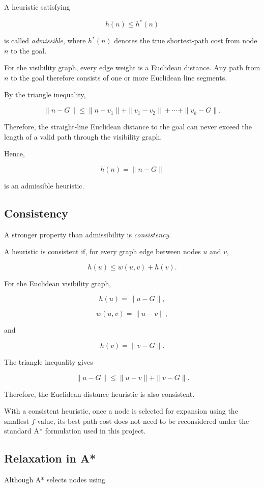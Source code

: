 A heuristic satisfying

\[
h(n)\leq h^*(n)
\]

is called \emph{admissible}, where $h^*(n)$ denotes the true shortest-path
cost from node $n$ to the goal.

For the visibility graph, every edge weight is a Euclidean distance.
Any path from $n$ to the goal therefore consists of one or more Euclidean
line segments.

By the triangle inequality,

\[
\|n-G\|
\leq
\|n-v_1\|
+
\|v_1-v_2\|
+
\cdots
+
\|v_k-G\|.
\]

Therefore, the straight-line Euclidean distance to the goal can never
exceed the length of a valid path through the visibility graph.

Hence,

\[
h(n)=\|n-G\|
\]

is an admissible heuristic.

\subsection{Consistency}

A stronger property than admissibility is \emph{consistency}.

A heuristic is consistent if, for every graph edge between nodes $u$ and
$v$,

\[
h(u)
\leq
w(u,v)+h(v).
\]

For the Euclidean visibility graph,

\[
h(u)=\|u-G\|,
\]

\[
w(u,v)=\|u-v\|,
\]

and

\[
h(v)=\|v-G\|.
\]

The triangle inequality gives

\[
\|u-G\|
\leq
\|u-v\|+\|v-G\|.
\]

Therefore, the Euclidean-distance heuristic is also consistent.

With a consistent heuristic, once a node is selected for expansion using
the smallest $f$-value, its best path cost does not need to be reconsidered
under the standard A* formulation used in this project.

\subsection{Relaxation in A*}

Although A* selects nodes using

